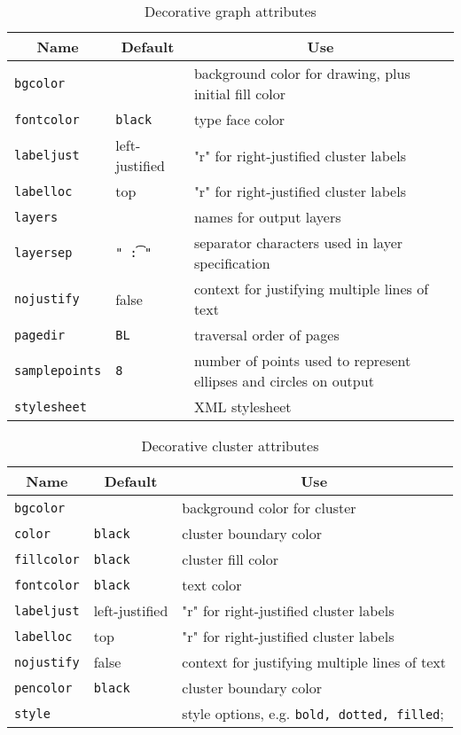 \begin{table}[htbp]\footnotesize
\centering
\begin{tabular}[t]{|l|l|p{2.5in}|} \hline
\multicolumn{1}{|c|}{Name} & \multicolumn{1}{c|}{Default} & \multicolumn{1}{c|}{Use} \\ \hline
{\tt bgcolor} &  & background color for drawing, plus initial fill color \\
{\tt fontcolor} & {\tt black} & type face color \\ 
{\tt labeljust} & left-justified & "r" for right-justified cluster labels \\
{\tt labelloc} & top & "r" for right-justified cluster labels \\
{\tt layers} & & names for output layers \\
{\tt layersep} & {\tt " \t:"} & separator characters used in layer specification \\
{\tt nojustify} & false & context for justifying multiple lines of text \\
{\tt pagedir} & {\tt BL} & traversal order of pages \\
{\tt samplepoints} & {\tt 8} & number of points used to represent ellipses
and circles on output \\
{\tt stylesheet} & & XML stylesheet \\
\hline
\end{tabular}
\caption{Decorative graph attributes}
\label{tab:gattr_dec}
\end{table}
\begin{table}[htbp]\footnotesize
\centering
\begin{tabular}[t]{|l|l|p{2.5in}|} \hline
\multicolumn{1}{|c|}{Name} & \multicolumn{1}{c|}{Default} & \multicolumn{1}{c|}{Use} \\ \hline
{\tt bgcolor} &  & background color for cluster \\
{\tt color} & {\tt black} & cluster boundary color \\
{\tt fillcolor} & {\tt black} & cluster fill color \\
{\tt fontcolor} & {\tt black} & text color \\
{\tt labeljust} & left-justified & "r" for right-justified cluster labels \\
{\tt labelloc} & top & "r" for right-justified cluster labels \\
{\tt nojustify} & false & context for justifying multiple lines of text \\
{\tt pencolor} & {\tt black} & cluster boundary color \\
{\tt style} & & style options, e.g. {\tt bold, dotted, filled}; \\ 
\hline
\end{tabular}
\caption{Decorative cluster attributes}
\label{tab:cattr_dec}
\end{table}

